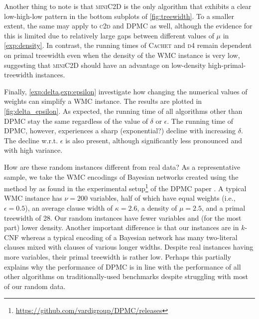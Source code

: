 Another thing to note is that \textsc{miniC2D} \citep{DBLP:conf/ijcai/OztokD15}
is the only algorithm that exhibits a clear low-high-low pattern in the bottom
subplots of \cref{fig:treewidth}. To a smaller extent, the same may apply to
\textsc{c2d} and \textsc{DPMC} as well, although the evidence for this is
limited due to relatively large gaps between different values of $\mu$ in
\cref{exp:density}. In contrast, the running times of \textsc{Cachet} and
\textsc{d4} remain dependent on primal treewidth even when the density of the
WMC instance is very low, suggesting that \textsc{miniC2D} should have an
advantage on low-density high-primal-treewidth instances.

Finally, \cref{exp:delta,exp:epsilon} investigate how changing the numerical
values of weights can simplify a WMC instance. The results are plotted in
\cref{fig:delta_epsilon}. As expected, the running time of all algorithms other
than \textsc{DPMC} stay the same regardless of the value of $\delta$ or
$\epsilon$. The running time of \textsc{DPMC}, however, experiences a sharp
(exponential?) decline with increasing $\delta$. The decline w.r.t. $\epsilon$
is also present, although significantly less pronounced and with high variance.

How are these random instances different from real data? As a representative
sample, we take the WMC encodings of Bayesian networks created using the method
by \citet{DBLP:conf/aaai/SangBK05} as found in the experimental
setup\footnote{\url{https://github.com/vardigroup/DPMC/releases}} of the
\textsc{DPMC} paper \citep{DBLP:conf/cp/DudekPV20}. A typical WMC instance has
$\nu = 200$ variables, half of which have equal weights (i.e.,
$\epsilon = 0.5$), an average clause width of $\kappa = 2.6$, a density of
$\mu = 2.5$, and a primal treewidth of 28. Our random instances have fewer
variables and (for the most part) lower density. Another important difference is
that our instances are in $k$-CNF whereas a typical encoding of a Bayesian
network has many two-literal clauses mixed with clauses of various longer
widths. Despite real instances having more variables, their primal treewidth is
rather low. Perhaps this partially explains why the performance of \textsc{DPMC}
is in line with the performance of all other algorithms on traditionally-used
benchmarks \citep{DBLP:conf/cp/DudekPV20} despite struggling with most of our
random data.

